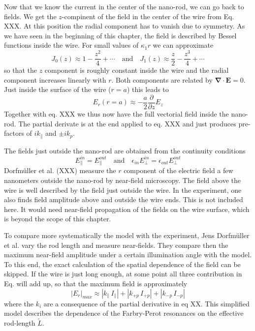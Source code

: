 Now that we know the current in the center of the nano-rod, we can go back to fields. We get the $z$-compinent of the field in the center of the wire from Eq. XXX. At this position the radial component has to vanish due to symmetry. As we have seen in the beginning of this chapter, the field is described by Bessel functions inside the wire. For small values of $\kappa_1 r$ we can approximate
\begin{equation}
  J_0(z) \approx 1 - \frac{z^2}{4}  + \cdots \quad \text{and} \quad  J_1(z) \approx \frac{z}{2} - \frac{z^3}{4} + \cdots
\end{equation}
so that the $z$ component is roughly constant inside the wire and the radial component increases linearly with $r$. Both components are related by $\mathbf{\nabla} \cdot \mathbf{E} = 0$. Just inside the surface of the wire ($r = a$) this leads to 
\begin{equation}
  E_r(r = a) \approx - \frac{a}{2} \frac{\partial}{\partial z} E_z
\end{equation}
 Together with eq. XXX we thus now have the full vectorial field inside the nano-rod. The partial derivate is at the end applied to eq. XXX and just produces pre-factors of $i k_\parallel$ and $\pm i k_p$.

The fields just outside the nano-rod are obtained from the continuity conditions
\begin{equation}
  E_\parallel^{in}  =  E_\parallel^{out} \quad \text{and} \quad 
  \epsilon_{in} E_\perp^{in}  =  \epsilon_{out}  E_\perp^{out}
\end{equation}
Dorfmüller et al. (XXX) measure the $r$ component of the electric field a few nanometers outside the nano-rod by near-field microscopy. The field above the wire is well described by the field just outside the wire. In the experiment, one also finds field amplitude above and outside  the wire ends. This is not included here. It would need near-field propagation of the fields on the wire surface, which is beyond the scope of this chapter.

To compare more systematically the model with the experiment, Jens Dorfmüller et al. vary the rod length and measure near-fields. They compare then the maximum near-field amplitude under a certain illumination angle with the model. To this end, the exact calculation of the spatial dependence of the field can be skipped. If the wire is just long enough, at some point all three contribution in Eq. will add up, so that the maximum field is approximately
\begin{equation}
  | E_r |_{max} \approx | k_\parallel \, I_\parallel | + | k_{+p} \, I_{+p} | +  | k_{-p} \, I_{-p} | 
\end{equation}
where the $k_i$ are a consequence of the partial derivative in eq XX. This simplified model describes the dependence of the Farbry-Perot resonances on the effective rod-length $\tilde{L}$.





